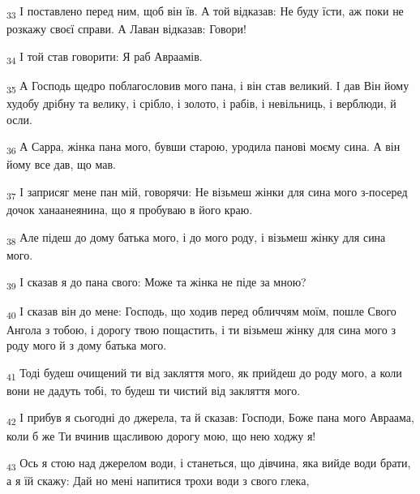 \begin{tcolorbox}
\textsubscript{33} І поставлено перед ним, щоб він їв. А той відказав: Не буду їсти, аж поки не розкажу своєї справи. А Лаван відказав: Говори!
\end{tcolorbox}
\begin{tcolorbox}
\textsubscript{34} І той став говорити: Я раб Авраамів.
\end{tcolorbox}
\begin{tcolorbox}
\textsubscript{35} А Господь щедро поблагословив мого пана, і він став великий. І дав Він йому худобу дрібну та велику, і срібло, і золото, і рабів, і невільниць, і верблюди, й осли.
\end{tcolorbox}
\begin{tcolorbox}
\textsubscript{36} А Сарра, жінка пана мого, бувши старою, уродила панові моєму сина. А він йому все дав, що мав.
\end{tcolorbox}
\begin{tcolorbox}
\textsubscript{37} І заприсяг мене пан мій, говорячи: Не візьмеш жінки для сина мого з-посеред дочок ханаанеянина, що я пробуваю в його краю.
\end{tcolorbox}
\begin{tcolorbox}
\textsubscript{38} Але підеш до дому батька мого, і до мого роду, і візьмеш жінку для сина мого.
\end{tcolorbox}
\begin{tcolorbox}
\textsubscript{39} І сказав я до пана свого: Може та жінка не піде за мною?
\end{tcolorbox}
\begin{tcolorbox}
\textsubscript{40} І сказав він до мене: Господь, що ходив перед обличчям моїм, пошле Свого Ангола з тобою, і дорогу твою пощастить, і ти візьмеш жінку для сина мого з роду мого й з дому батька мого.
\end{tcolorbox}
\begin{tcolorbox}
\textsubscript{41} Тоді будеш очищений ти від закляття мого, як прийдеш до роду мого, а коли вони не дадуть тобі, то будеш ти чистий від закляття мого.
\end{tcolorbox}
\begin{tcolorbox}
\textsubscript{42} І прибув я сьогодні до джерела, та й сказав: Господи, Боже пана мого Авраама, коли б же Ти вчинив щасливою дорогу мою, що нею ходжу я!
\end{tcolorbox}
\begin{tcolorbox}
\textsubscript{43} Ось я стою над джерелом води, і станеться, що дівчина, яка вийде води брати, а я їй скажу: Дай но мені напитися трохи води з свого глека,
\end{tcolorbox}
